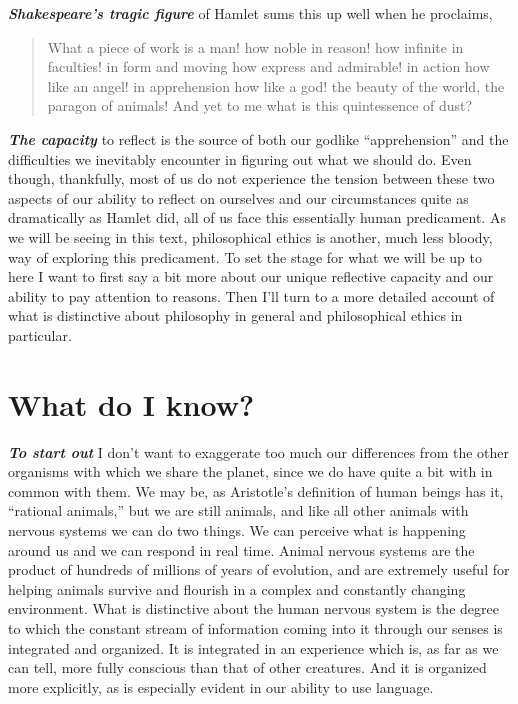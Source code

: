 \documentclass[12pt, openany]{book}
\begin{document}
\textbf{\emph{Shakespeare's tragic figure}} of Hamlet sums this up well when he proclaims,

\begin{quote}
What a piece of work is a man! how noble in reason! how infinite in faculties! in form and moving how express and admirable! in action how like an angel! in apprehension how like a god! the beauty of the world, the paragon of animals! And yet to me what is this quintessence of dust?
\end{quote}

\textbf{\emph{The capacity}} to reflect is the source of both our godlike ``apprehension'' and the difficulties we inevitably encounter in figuring out what we should do. Even though, thankfully, most of us do not experience the tension between these two aspects of our ability to reflect on ourselves and our circumstances quite as dramatically as Hamlet did, all of us face this essentially human predicament. As we will be seeing in this text, philosophical ethics is another, much less bloody, way of exploring this predicament. To set the stage for what we will be up to here I want to first say a bit more about our unique reflective capacity and our ability to pay attention to reasons. Then I'll turn to a more detailed account of what is distinctive about philosophy in general and philosophical ethics in particular.

\hypertarget{what-do-i-know}{%
\section{What do I know?}\label{what-do-i-know}}

\textbf{\emph{To start out}} I don't want to exaggerate too much our differences from the other organisms with which we share the planet, since we do have quite a bit with in common with them. We may be, as Aristotle's definition of human beings has it, ``rational animals,'' but we are still animals, and like all other animals with nervous systems we can do two things. We can perceive what is happening around us and we can respond in real time. Animal nervous systems are the product of hundreds of millions of years of evolution, and are extremely useful for helping animals survive and flourish in a complex and constantly changing environment. What is distinctive about the human nervous system is the degree to which the constant stream of information coming into it through our senses is integrated and organized. It is integrated in an experience which is, as far as we can tell, more fully conscious than that of other creatures. And it is organized more explicitly, as is especially evident in our ability to use language.
\end{document}
